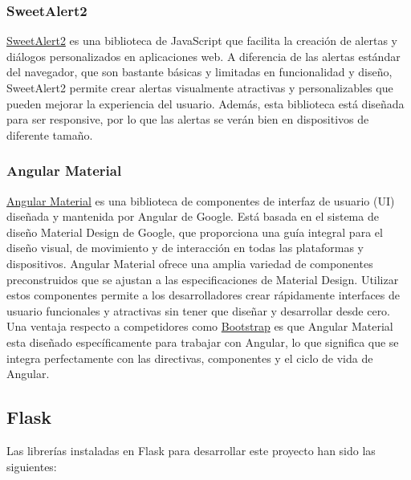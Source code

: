 \subsubsection{SweetAlert2}
\href{https://sweetalert2.github.io/}{SweetAlert2} es una biblioteca de JavaScript que facilita la creación de alertas y diálogos personalizados en aplicaciones web. A diferencia de las alertas estándar del navegador, que son bastante básicas y limitadas en funcionalidad y diseño, SweetAlert2 permite crear alertas visualmente atractivas y personalizables que pueden mejorar la experiencia del usuario. Además, esta biblioteca está diseñada para ser responsive, por lo que las alertas se verán bien en dispositivos de diferente tamaño.

\subsubsection{Angular Material} 
\href{https://material.angular.io/}{Angular Material} es una biblioteca de componentes de interfaz de usuario (UI) diseñada y mantenida por Angular de Google. Está basada en el sistema de diseño Material Design de Google, que proporciona una guía integral para el diseño visual, de movimiento y de interacción en todas las plataformas y dispositivos. Angular Material ofrece una amplia variedad de componentes preconstruidos que se ajustan a las especificaciones de Material Design. Utilizar estos componentes permite a los desarrolladores crear rápidamente interfaces de usuario funcionales y atractivas sin tener que diseñar y desarrollar desde cero. Una ventaja respecto a competidores como \href{https://getbootstrap.com/}{Bootstrap} es que Angular Material esta diseñado específicamente para trabajar con Angular, lo que significa que se integra perfectamente con las directivas, componentes y el ciclo de vida de Angular.
\subsection{Flask}
Las librerías instaladas en Flask para desarrollar este proyecto han sido las siguientes:

